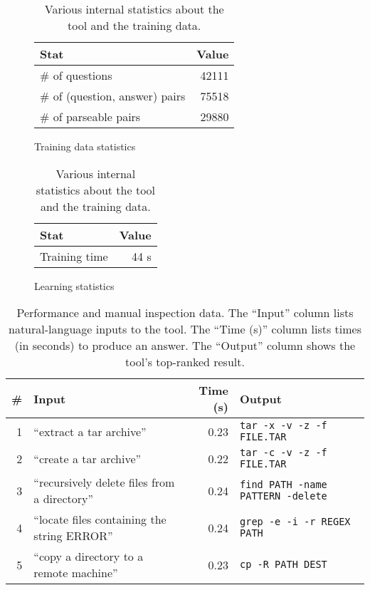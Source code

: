 \begin{table}
    \begin{subfigure}[b]{0.48\textwidth}
        \begin{center}
        \begin{tabular}[t]{lr}
            \textbf{Stat} & \textbf{Value} \\
            \hline
            \# of questions                & 42111 \\
            \# of (question, answer) pairs & 75518 \\
            \# of parseable pairs          & 29880 \\
        \end{tabular}
        \end{center}
        \caption{Training data statistics}
    \end{subfigure}
    \begin{subfigure}[b]{0.48\textwidth}
        \begin{center}
        \begin{tabular}[t]{lr}
            \textbf{Stat} & \textbf{Value} \\
            \hline
            Training time & 44 s \\
        \end{tabular}
        \end{center}
        \caption{Learning statistics}
    \end{subfigure}
    \caption{Various internal statistics about the tool and the training data.}
    \label{tbl:stats}
\end{table}

\begin{table}[ht]
    \begin{center}
    \begin{tabular}{rlrl}
        \# & \textbf{Input} & \textbf{Time (s)} & \textbf{Output} \\
        \hline
        1  & ``extract a tar archive'' & 0.23 & \texttt{tar -x -v -z -f FILE.TAR} \\
        2  & ``create a tar archive''  & 0.22 & \texttt{tar -c -v -z -f FILE.TAR} \\
        3  & ``recursively delete files from a directory'' & 0.24 & \texttt{find PATH -name PATTERN -delete} \\
        4  & ``locate files containing the string ERROR''  & 0.24 & \texttt{grep -e -i -r REGEX PATH} \\
        5  & ``copy a directory to a remote machine'' & 0.23 & \texttt{cp -R PATH DEST} \\
    \end{tabular}
    \end{center}
    \caption{Performance and manual inspection data. The ``Input'' column lists
        natural-language inputs to the tool. The ``Time (s)'' column lists times
        (in seconds) to produce an answer. The ``Output'' column shows the
        tool's top-ranked result.}
    \label{tbl:manual-inspection}
\end{table}

